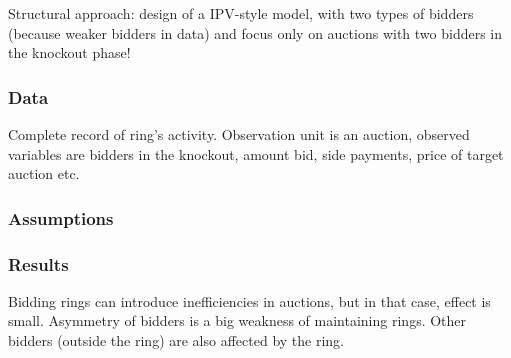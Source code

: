 Structural approach: design of a IPV-style model, with two types of bidders (because weaker bidders in data) and focus only on auctions with two bidders in the knockout phase!

\subsubsection{Data}

Complete record of ring's activity. Observation unit is an auction, observed variables are bidders in the knockout, amount bid, side payments, price of target auction etc.

\subsubsection{Assumptions}



\subsubsection{Results}

Bidding rings can introduce inefficiencies in auctions, but in that case, effect is small. Asymmetry of bidders is a big weakness of maintaining rings. Other bidders (outside the ring) are also affected by the ring.